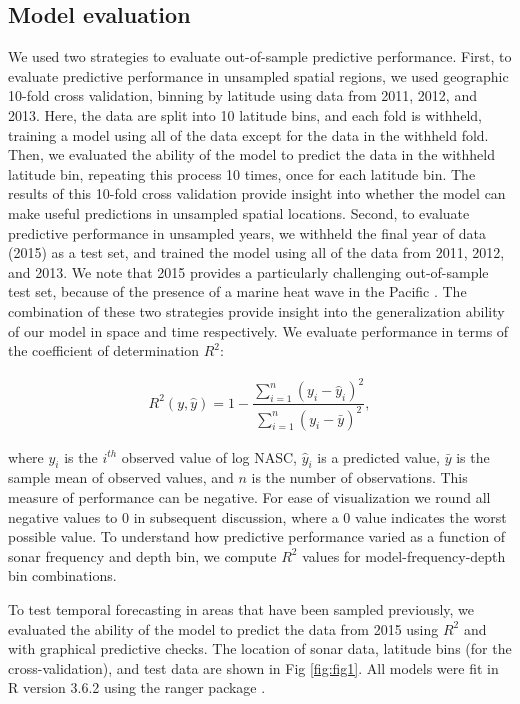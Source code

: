 \documentclass[10pt,letterpaper]{article}
\begin{document}
\subsection*{Model evaluation}

We used two strategies to evaluate out-of-sample predictive performance. 
First, to evaluate predictive performance in unsampled spatial regions, we used geographic 10-fold cross validation, binning by latitude using data from 2011, 2012, and 2013. 
Here, the data are split into 10 latitude bins, and each fold is withheld, training a model using all of the data except for the data in the withheld fold. 
Then, we evaluated the ability of the model to predict the data in the withheld latitude bin, repeating this process 10 times, once for each latitude bin. 
The results of this 10-fold cross validation provide insight into whether the model can make useful predictions in unsampled spatial locations. 
Second, to evaluate predictive performance in unsampled years, we withheld the final year of data (2015) as a test set, and trained the model using all of the data from 2011, 2012, and 2013. 
We note that 2015 provides a particularly challenging out-of-sample test set, because of the presence of a marine heat wave in the Pacific \cite{di2016multi}.
The combination of these two strategies provide insight into the generalization ability of our model in space and time respectively.
We evaluate performance in terms of the coefficient of determination $R^2$: 

\begin{gather*}
R^2(y, \hat{y}) = 1 - \dfrac{\sum_{i = 1}^n (y_i - \hat{y}_i)^2}{\sum_{i = 1}^n (y_i - \bar{y})^2},
\end{gather*}

where $y_i$ is the $i^{th}$ observed value of log NASC, $\hat{y}_i$ is a predicted value, $\bar{y}$ is the sample mean of observed values, and $n$ is the number of observations. 
This measure of performance can be negative. 
For ease of visualization we round all negative values to 0 in subsequent discussion, where a 0 value indicates the worst possible value.
To understand how predictive performance varied as a function of sonar frequency and depth bin, we compute $R^2$ values for model-frequency-depth bin combinations.

To test temporal forecasting in areas that have been sampled previously, we  evaluated the ability of the model to predict the data from 2015 using $R^2$ and with graphical predictive checks.
The location of sonar data, latitude bins (for the cross-validation), and test data are shown in Fig \ref{fig:fig1}.
All models were fit in R version 3.6.2 using the ranger package \cite{ranger,rcore}.
\end{document}
